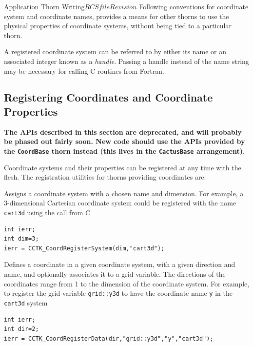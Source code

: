 \begin{cactuspart}{Application Thorn Writing}{$RCSfile$}{$Revision$}
Following conventions for coordinate system and coordinate names,
provides a means for other thorns to use the physical properties of
coordinate systems, without being tied to a particular thorn.

A registered coordinate system can be referred to by either its name or
an associated integer known as a \textit{handle}. Passing a handle instead
of the name string may be necessary for calling C routines from Fortran.


\subsection{Registering Coordinates and Coordinate Properties}

\textbf{The APIs described in this section are deprecated, and will
probably be phased out fairly soon.
New code should use the APIs provided by the \texttt{CoordBase} thorn
instead (this lives in the \texttt{CactusBase} arrangement).}

Coordinate systems and their properties can be registered at any time with the flesh.
The registration utilities for thorns providing coordinates are:
\begin{Lentry}

\item[\texttt{CCTK\_CoordRegisterSystem}]

Assigns a coordinate system with a chosen name and dimension. For example,
a 3-dimensional Cartesian coordinate system could be registered with the
name \texttt{cart3d} using the call from C
%
\begin{verbatim}
int ierr;
int dim=3;
ierr = CCTK_CoordRegisterSystem(dim,"cart3d");
\end{verbatim}

\item[\texttt{CCTK\_CoordRegisterData}]

Defines a coordinate in a given coordinate system, with a given
        direction and name, and optionally associates it to a grid variable.
The directions of the coordinates range from 1 to the dimension of the
coordinate system. For example, to register the grid variable \texttt{grid::y3d}
to have the coordinate name \texttt{y} in the \texttt{cart3d} system
%
\begin{verbatim}
int ierr;
int dir=2;
ierr = CCTK_CoordRegisterData(dir,"grid::y3d","y","cart3d");
\end{verbatim}

\item[\texttt{CCTK\_CoordRegisterRange}]


\end{Lentry}
\end{cactuspart}
